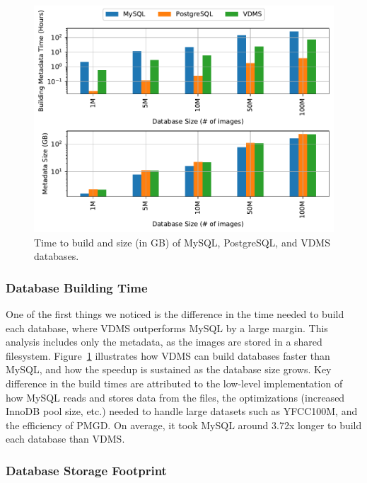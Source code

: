 \begin{figure}[ht]
\centering
\includegraphics[width=\columnwidth]{figures/all_build_times_plot}
\caption{Time to build and size (in GB) of MySQL, PostgreSQL, and VDMS databases.}
\label{fig:db_time_size}
\end{figure}

\subsubsection{Database Building Time}

One of the first things we noticed is the difference in the time needed to
build each database, where VDMS outperforms MySQL by a large margin.
This analysis includes only the metadata, as the images are stored in a shared filesystem.
Figure~\ref{fig:db_time_size} illustrates how VDMS can build databases
faster than MySQL, and how the speedup is sustained as the database size grows.
Key difference in the build times are attributed to the low-level
implementation of how MySQL reads and stores data from the files, the
optimizations (increased InnoDB pool size, etc.) needed
to handle large datasets such as YFCC100M, and the efficiency of PMGD.
On average, it took MySQL around 3.72x longer to build each database than VDMS.

\subsubsection{Database Storage Footprint}

